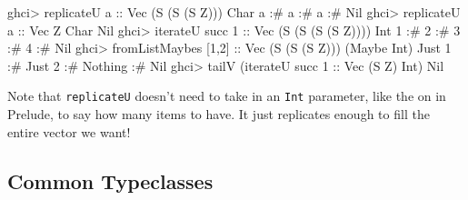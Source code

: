 \documentclass[]{article}
\newenvironment{Shaded}{}{}
\newcommand{\CharTok}[1]{\textcolor[rgb]{0.25,0.44,0.63}{#1}}
\newcommand{\DataTypeTok}[1]{\textcolor[rgb]{0.56,0.13,0.00}{#1}}
\newcommand{\DecValTok}[1]{\textcolor[rgb]{0.25,0.63,0.44}{#1}}
\newcommand{\FunctionTok}[1]{\textcolor[rgb]{0.02,0.16,0.49}{#1}}
\newcommand{\NormalTok}[1]{#1}
\newcommand{\OperatorTok}[1]{\textcolor[rgb]{0.40,0.40,0.40}{#1}}
\newcommand{\OtherTok}[1]{\textcolor[rgb]{0.00,0.44,0.13}{#1}}
\begin{document}
\begin{Shaded}
\begin{Highlighting}[]
\NormalTok{ghci}\OperatorTok{\textgreater{}}\NormalTok{ replicateU }\CharTok{\textquotesingle{}a\textquotesingle{}}\OtherTok{       ::} \DataTypeTok{Vec}\NormalTok{ (}\DataTypeTok{S}\NormalTok{ (}\DataTypeTok{S}\NormalTok{ (}\DataTypeTok{S} \DataTypeTok{Z}\NormalTok{))) }\DataTypeTok{Char}
\CharTok{\textquotesingle{}a\textquotesingle{}} \OperatorTok{:\#} \CharTok{\textquotesingle{}a\textquotesingle{}} \OperatorTok{:\#} \CharTok{\textquotesingle{}a\textquotesingle{}} \OperatorTok{:\#} \DataTypeTok{Nil}
\NormalTok{ghci}\OperatorTok{\textgreater{}}\NormalTok{ replicateU }\CharTok{\textquotesingle{}a\textquotesingle{}}\OtherTok{       ::} \DataTypeTok{Vec} \DataTypeTok{Z} \DataTypeTok{Char}
\DataTypeTok{Nil}
\NormalTok{ghci}\OperatorTok{\textgreater{}}\NormalTok{ iterateU }\FunctionTok{succ} \DecValTok{1}\OtherTok{      ::} \DataTypeTok{Vec}\NormalTok{ (}\DataTypeTok{S}\NormalTok{ (}\DataTypeTok{S}\NormalTok{ (}\DataTypeTok{S}\NormalTok{ (}\DataTypeTok{S} \DataTypeTok{Z}\NormalTok{)))) }\DataTypeTok{Int}
\DecValTok{1} \OperatorTok{:\#} \DecValTok{2} \OperatorTok{:\#} \DecValTok{3} \OperatorTok{:\#} \DecValTok{4} \OperatorTok{:\#} \DataTypeTok{Nil}
\NormalTok{ghci}\OperatorTok{\textgreater{}}\NormalTok{ fromListMaybes [}\DecValTok{1}\NormalTok{,}\DecValTok{2}\NormalTok{]}\OtherTok{ ::} \DataTypeTok{Vec}\NormalTok{ (}\DataTypeTok{S}\NormalTok{ (}\DataTypeTok{S}\NormalTok{ (}\DataTypeTok{S} \DataTypeTok{Z}\NormalTok{))) (}\DataTypeTok{Maybe} \DataTypeTok{Int}\NormalTok{)}
\DataTypeTok{Just} \DecValTok{1} \OperatorTok{:\#} \DataTypeTok{Just} \DecValTok{2} \OperatorTok{:\#} \DataTypeTok{Nothing} \OperatorTok{:\#} \DataTypeTok{Nil}
\NormalTok{ghci}\OperatorTok{\textgreater{}}\NormalTok{ tailV (iterateU }\FunctionTok{succ} \DecValTok{1}\OtherTok{ ::} \DataTypeTok{Vec}\NormalTok{ (}\DataTypeTok{S} \DataTypeTok{Z}\NormalTok{) }\DataTypeTok{Int}\NormalTok{)}
\DataTypeTok{Nil}
\end{Highlighting}
\end{Shaded}

Note that \texttt{replicateU} doesn't need to take in an \texttt{Int} parameter,
like the on in Prelude, to say how many items to have. It just replicates enough
to fill the entire vector we want!

\subsection{Common Typeclasses}\label{common-typeclasses}
\end{document}
